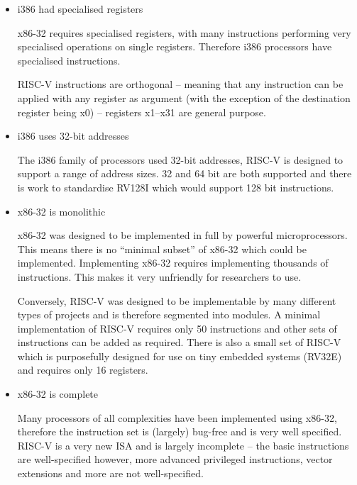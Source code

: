 \documentclass[10pt,\jkfside,a4paper]{article}
\begin{document}
\begin{enumerate}
\begin{itemize}
\item i386 had specialised registers

x86-32 requires specialised registers, with many instructions performing very
specialised operations on single registers. Therefore i386 processors have
specialised instructions.

RISC-V instructions are orthogonal -- meaning that any instruction can be
applied with any register as argument (with the exception of the
destination register being x0) -- registers x1--x31 are general purpose.

\item i386 uses 32-bit addresses

The i386 family of processors used 32-bit addresses, RISC-V is designed to
support a range of address sizes. 32 and 64 bit are both supported and there
is work to standardise RV128I which would support 128 bit instructions.

\item x86-32 is monolithic

x86-32 was designed to be implemented in full by powerful microprocessors.
This means there is no ``minimal subset'' of x86-32 which could be
implemented. Implementing x86-32 requires implementing thousands of
instructions. This makes it very unfriendly for researchers to use.

Conversely, RISC-V was designed to be implementable by many different types
of projects and is therefore segmented into modules. A minimal
implementation of RISC-V requires only 50 instructions and other sets of
instructions can be added as required. There is also a small set of RISC-V
which is purposefully designed for use on tiny embedded systems (RV32E) and
requires only 16 registers.

\item x86-32 is complete

Many processors of all complexities have been implemented using x86-32,
therefore the instruction set is (largely) bug-free and is very well
specified. RISC-V is a very new ISA and is largely incomplete -- the basic
instructions are well-specified however, more advanced privileged
instructions, vector extensions and more are not well-specified.

\end{itemize}

\end{enumerate}
\end{document}

